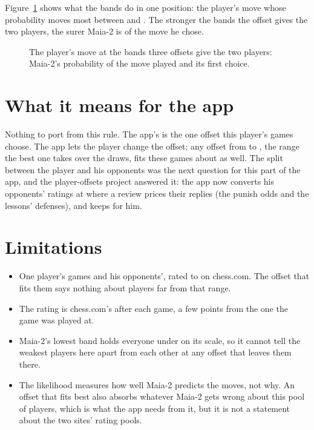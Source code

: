 \documentclass[11pt]{article}
\begin{document}
Figure~\ref{fig:example} shows what the bands do in one position: the player's move whose
probability moves most between \OffsetMin{} and \OffsetMax. The stronger the bands the offset
gives the two players, the surer Maia-2 is of the move he chose.

\begin{figure}[!htbp]\Example\caption{The player's move at the bands three offsets give the two
players: Maia-2's probability of the move played and its first choice.}\label{fig:example}
\end{figure}

\section{What it means for the app}

Nothing to port from this rule. The app's \AppOffset{} is the one offset this player's games
choose. The app lets the player change the offset; any offset from \BestAllLo{} to \BestAllHi,
the range the best one takes over the draws, fits these games about as well. The split between
the player and his opponents was the next question for this part of the app, and the
player-offsets project answered it: the app now converts his opponents' ratings at
\AppOpponentOffset{} where a review prices their replies (the punish odds and the lessons'
defenses), and keeps \AppOffset{} for him.

\section{Limitations}

\begin{itemize}[nosep]
\item One player's games and his opponents', rated \RatingMin{} to \RatingMax{} on chess.com. The
offset that fits them says nothing about players far from that range.
\item The rating is chess.com's after each game, a few points from the one the game was played
at.
\item Maia-2's lowest band holds everyone under \MaiaStart{} on its scale, so it cannot tell the
weakest players here apart from each other at any offset that leaves them there.
\item The likelihood measures how well Maia-2 predicts the moves, not why. An offset that fits
best also absorbs whatever Maia-2 gets wrong about this pool of players, which is what the app
needs from it, but it is not a statement about the two sites' rating pools.
\end{itemize}
\end{document}
